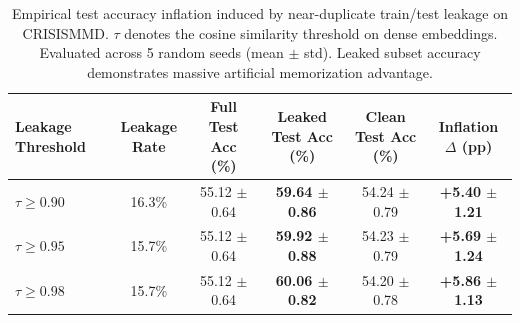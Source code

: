 \begin{table}[t]
\centering
\caption{Empirical test accuracy inflation induced by near-duplicate train/test leakage on CRISISMMD. $\tau$ denotes the cosine similarity threshold on dense embeddings. Evaluated across 5 random seeds (mean $\pm$ std). Leaked subset accuracy demonstrates massive artificial memorization advantage.}
\label{tab:leakage_impact_crisismmd}
\begin{tabular}{lccccc}
\toprule
\textbf{Leakage Threshold} & \textbf{Leakage Rate} & \textbf{Full Test Acc (\%)} & \textbf{Leaked Test Acc (\%)} & \textbf{Clean Test Acc (\%)} & \textbf{Inflation $\Delta$ (pp)} \\
\midrule
$\tau \ge 0.90$ & 16.3\% & 55.12 $\pm$ 0.64 & \textbf{59.64 $\pm$ 0.86} & 54.24 $\pm$ 0.79 & \textbf{+5.40 $\pm$ 1.21} \\
$\tau \ge 0.95$ & 15.7\% & 55.12 $\pm$ 0.64 & \textbf{59.92 $\pm$ 0.88} & 54.23 $\pm$ 0.79 & \textbf{+5.69 $\pm$ 1.24} \\
$\tau \ge 0.98$ & 15.7\% & 55.12 $\pm$ 0.64 & \textbf{60.06 $\pm$ 0.82} & 54.20 $\pm$ 0.78 & \textbf{+5.86 $\pm$ 1.13} \\
\bottomrule
\end{tabular}
\end{table}
